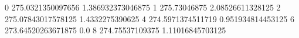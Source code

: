0 275.0321350097656 1.386932373046875
1 275.73046875 2.08526611328125
2 275.07843017578125 1.4332275390625
4 274.5971374511719 0.951934814453125
6 273.64520263671875 0.0
8 274.75537109375 1.11016845703125
